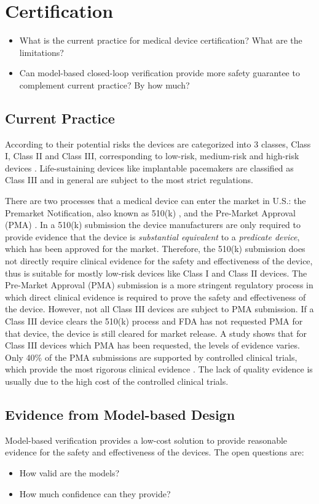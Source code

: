 

\chapter{Certification}
\begin{itemize}
          	\item What is the current practice for medical device certification? What are the limitations?
          	\item Can model-based closed-loop verification provide more safety guarantee to complement current practice? By how much?
          \end{itemize}
          
\section{Current Practice}
According to their potential risks the devices are categorized into 3 classes, Class I, Class II and Class III, corresponding to low-risk, medium-risk and high-risk devices \cite{class}. Life-sustaining devices like implantable pacemakers are classified as Class III and in general are subject to the most strict regulations.

There are two processes that a medical device can enter the market in U.S.: the Premarket Notification, also known as 510(k) \cite{510k}, and the Pre-Market Approval (PMA) \cite{PMA}. In a 510(k) submission the device manufacturers are only required to provide evidence that the device is \emph{substantial equivalent} to a \emph{predicate device}, which has been approved for the market. Therefore, the 510(k) submission does not directly require clinical evidence for the safety and effectiveness of the device, thus is suitable for mostly low-risk devices like Class I and Class II devices.  The Pre-Market Approval (PMA) submission is a more stringent regulatory process in which direct clinical evidence is required to prove the safety and effectiveness of the device. However, not all Class III devices are subject to PMA submission. If a Class III device clears the 510(k) process and FDA has not requested PMA for that device, the device is still cleared for market release. A study shows that for Class III devices which PMA has been requested, the levels of evidence varies. Only 40\% of the PMA submissions are supported by controlled clinical trials, which provide the most rigorous clinical evidence \cite{cert_prob}. The lack of quality evidence is usually due to the high cost of the controlled clinical trials.
\section{Evidence from Model-based Design}
Model-based verification provides a low-cost solution to provide reasonable evidence for the safety and effectiveness of the devices. The open questions are:

\begin{itemize}
	\item How valid are the models?
	\item How much confidence can they provide?
\end{itemize}
